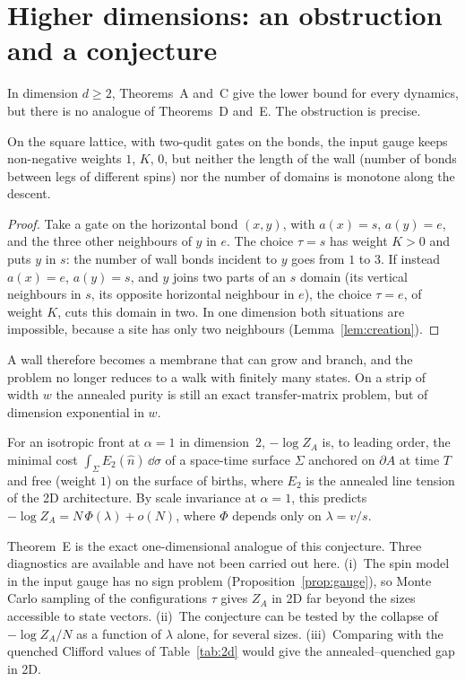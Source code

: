 \section{Higher dimensions: an obstruction and a conjecture}\label{sec:dimsup}

In dimension $d\ge2$, Theorems~A and~C give the lower bound for every dynamics, but there is no analogue of Theorems~D and~E. The obstruction is precise.

\begin{proposition}\label{prop:obstruction}
On the square lattice, with two-qudit gates on the bonds, the input gauge keeps non-negative weights $1$, $K$, $0$, but neither the length of the wall (number of bonds between legs of different spins) nor the number of domains is monotone along the descent.
\end{proposition}
\begin{proof}
Take a gate on the horizontal bond $(x,y)$, with $a(x)=s$, $a(y)=e$, and the three other neighbours of $y$ in $e$. The choice $\tau=s$ has weight $K>0$ and puts $y$ in $s$: the number of wall bonds incident to $y$ goes from $1$ to $3$. If instead $a(x)=e$, $a(y)=s$, and $y$ joins two parts of an $s$ domain (its vertical neighbours in $s$, its opposite horizontal neighbour in $e$), the choice $\tau=e$, of weight $K$, cuts this domain in two. In one dimension both situations are impossible, because a site has only two neighbours (Lemma~\ref{lem:creation}).
\end{proof}

A wall therefore becomes a membrane that can grow and branch, and the problem no longer reduces to a walk with finitely many states. On a strip of width $w$ the annealed purity is still an exact transfer-matrix problem, but of dimension exponential in $w$.

\begin{conjecture}[membrane]\label{conj:membrane}
For an isotropic front at $\alpha=1$ in dimension~2, $-\log Z_A$ is, to leading order, the minimal cost $\int_\Sigma E_2(\hat n)\,\dd\sigma$ of a space-time surface $\Sigma$ anchored on $\partial A$ at time $T$ and free (weight $1$) on the surface of births, where $E_2$ is the annealed line tension of the 2D architecture. By scale invariance at $\alpha=1$, this predicts $-\log Z_A=N\,\Phi(\lambda)+o(N)$, where $\Phi$ depends only on $\lambda=v/s$.
\end{conjecture}

Theorem~E is the exact one-dimensional analogue of this conjecture. Three diagnostics are available and have not been carried out here. (i)~The spin model in the input gauge has no sign problem (Proposition~\ref{prop:gauge}), so Monte Carlo sampling of the configurations $\tau$ gives $Z_A$ in 2D far beyond the sizes accessible to state vectors. (ii)~The conjecture can be tested by the collapse of $-\log Z_A/N$ as a function of $\lambda$ alone, for several sizes. (iii)~Comparing with the quenched Clifford values of Table~\ref{tab:2d} would give the annealed--quenched gap in 2D.
